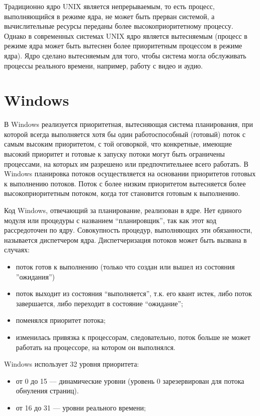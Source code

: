 Традиционно ядро UNIX является непрерываемым, то есть процесс, выполняющийся в режиме ядра, не может быть прерван системой, а вычислительные ресурсы переданы более высокоприоритетному процессу. Однако в современных системах UNIX ядро является вытесняемым (процесс в режиме ядра может быть вытеснен более приоритетным процессом в режиме ядра). Ядро сделано вытесняемым для того, чтобы система могла обслуживать процессы реального времени, например, работу с видео и аудио.

\section{Windows}

В Windows реализуется приоритетная, вытесняющая система планирования, при которой всегда выполняется хотя бы один работоспособный (готовый) поток с самым высоким приоритетом, с той оговоркой, что конкретные, имеющие высокий приоритет и готовые к запуску потоки могут быть
ограничены процессами, на которых им разрешено или предпочтительнее всего работать. В Windows планировка потоков осуществляется на основании приоритетов готовых к выполнению потоков. Поток с более низким приоритетом вытесняется более высокоприоритетным потоком, когда тот становится готовым к выполнению.

Код Windows, отвечающий за планирование, реализован в ядре. Нет единого модуля или процедуры с названием ``планировщик'', так как этот
код рассредоточен по ядру. Совокупность процедур, выполняющих эти обязанности, называется диспетчером ядра. Диспетчеризация потоков может
быть вызвана в случаях:

\begin{itemize}
    \item поток готов к выполнению (только что создан или вышел из состояния ”ожидания”)
    \item поток выходит из состояния ``выполняется'', т.к. его квант истек, либо поток завершается, либо переходит в состояние ``ожидание'';
    \item поменялся приоритет потока;
    \item изменилась привязка к процессорам, следовательно, поток больше не может работать на процессоре, на котором он выполнялся.
\end{itemize}


Windows использует 32 уровня приоритета:
\begin{itemize}
    \item от 0 до 15 --- динамические уровни (уровень 0 зарезервирован для потока обнуления страниц).
    \item от 16 до 31 --- уровни реального времени;
\end{itemize}

